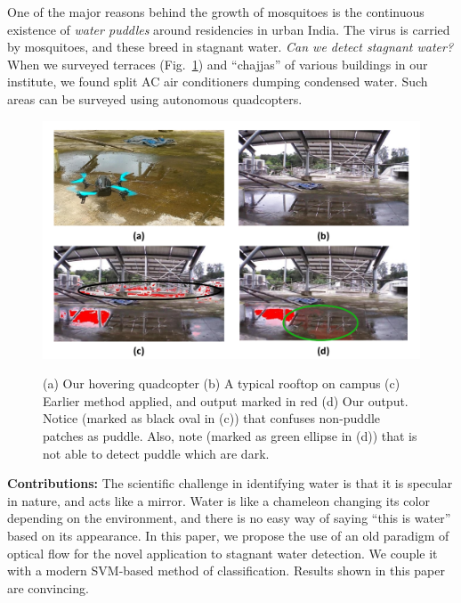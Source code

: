 \documentclass[times,10pt,twocolumn]{article}
\begin{document}
One of the major reasons behind the growth of mosquitoes is the
continuous existence of \emph{water puddles} around residencies in
urban India.  The virus is carried by mosquitoes, and these breed in
stagnant water. \emph{Can we detect stagnant water?}  When we surveyed
terraces (Fig.~\ref{teaser}) and ``chajjas'' of various buildings in
our institute, we found split AC air conditioners dumping condensed
water. Such areas can be surveyed using autonomous quadcopters.

\begin{figure}[h!]
\centering
\includegraphics[width=\linewidth]{images/teaser.pdf}
\label{teaser} \caption{(a) Our hovering quadcopter (b) A typical
  rooftop on campus (c) Earlier method \cite{rankin2004daytime} applied, and
  output marked in red (d) Our output. Notice (marked as black oval in
  (c)) that \cite{rankin2004daytime} confuses non-puddle patches as puddle.
  Also, note (marked as green ellipse in (d)) that \cite{rankin2004daytime} is
  not able to detect puddle which are dark.}
\end{figure}

\textbf{Contributions:} The scientific challenge in identifying water
is that it is specular in nature, and acts like a mirror.  Water is
like a chameleon changing its color depending on the environment, and
there is no easy way of saying ``this is water'' based on its
appearance. In this paper, we propose the use of an old paradigm of
optical flow for the novel application to stagnant water detection.
We couple it with a modern SVM-based method of classification.
Results shown in this paper are convincing.
\end{document}
